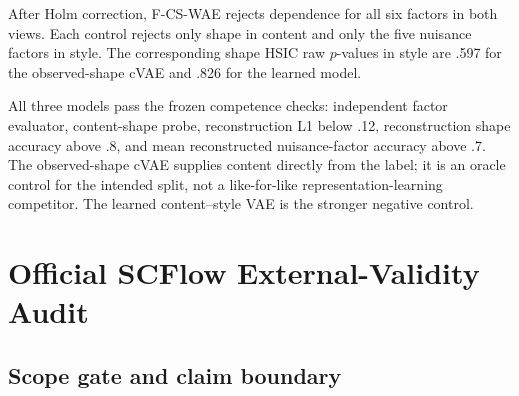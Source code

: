 After Holm correction, F-CS-WAE rejects dependence for all six factors in
both views.  Each control rejects only shape in content and only the five
nuisance factors in style.  The corresponding shape HSIC raw $p$-values in
style are .597 for the observed-shape cVAE and .826 for the learned model.

\begin{table}[ht]
\caption{Seed-0 independent factor-evaluator decoder checks.  Posterior swaps keep
content from the source and style from a different-shape donor; ``target'' is
source shape for shape and donor value for nuisance factors.}
\label{tab:shapes3d-decoder-full}
\centering
\scriptsize
\setlength{\tabcolsep}{3pt}
\end{table}

All three models pass the frozen competence checks: independent factor
evaluator, content-shape probe, reconstruction L1 below .12, reconstruction
shape accuracy above .8, and mean reconstructed nuisance-factor accuracy
above .7.  The observed-shape cVAE supplies content directly from the label;
it is an oracle control for the intended split, not a like-for-like
representation-learning competitor.  The learned content--style VAE is the
stronger negative control.

\section{Official SCFlow External-Validity Audit}
\label{app:scflow}

\subsection{Scope gate and claim boundary}

